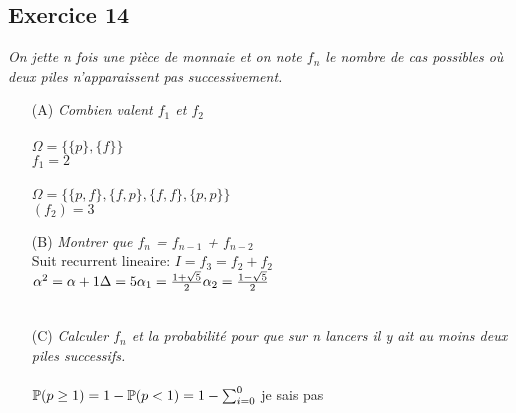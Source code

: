 \subsection*{Exercice 14} %
\textit{On jette n fois une pièce de monnaie et on note $f_n$ le nombre de cas possibles où deux piles n’apparaissent pas successivement.}
\begin{itemize}
    \item[(A)]  \textit{Combien valent $f_1$ et $f_2$}
    \\
    \\
    $\Omega = \{\{p\},\{f\}\}$ \\ 
    $f_1 = 2$
    \\
    \\
    $\Omega = \{\{p,f\},\{f, p\}, \{f, f\},\{p, p\}\}$ \\ 
    $(f_2) = 3$ 
    \\
    \item[(B)]  \textit{Montrer que $f_n$ = $f_{n-1}$ + $f_{n-2}$}\\
    Suit recurrent lineaire:
    $I = f_3 = f_2 + f_2$ \\
    $\alpha^2 = \alpha + 1 \\
    \Delta = 5 \\
    \alpha_1 = \frac{1+ \sqrt{5}}{2} \\
    \alpha_2 = \frac{1- \sqrt{5}}{2} \\$
    
\begin{align*}
\end{align*}
    
    \item[(C)]  \textit{Calculer $f_n$ et la probabilité pour que sur n lancers il y ait au moins deux piles successifs.}
    \\
    \\
    $\mathbb{P}(p \geq 1) = 1 - \mathbb{P}(p < 1) = 1 -\sum_{i = 0}^{0}$ je sais pas
\end{itemize}
    
    